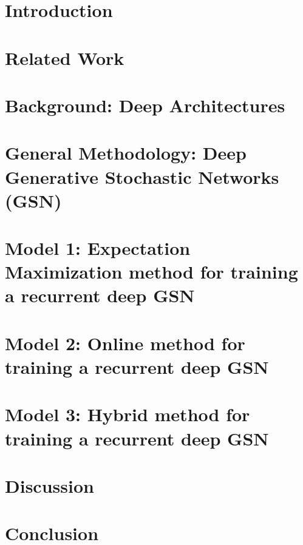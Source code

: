 \documentclass[12pt, titlepage]{report}
\begin{document}
	\tableofcontents
	\listoftables
	\listoffigures
	
	\chapter{Introduction}
	
	
	\chapter{Related Work}
	
	
	\chapter{Background: Deep Architectures}
	
	
	\chapter{General Methodology: Deep Generative Stochastic Networks (GSN)}
	
	
	\chapter{Model 1: Expectation Maximization method for training a recurrent deep GSN}
	
	
	\chapter{Model 2: Online method for training a recurrent deep GSN}	
	

	\chapter{Model 3: Hybrid method for training a recurrent deep GSN}	
	
	
	\chapter{Discussion}
	
	
	\chapter{Conclusion}
	
	
	
	
\end{document}
